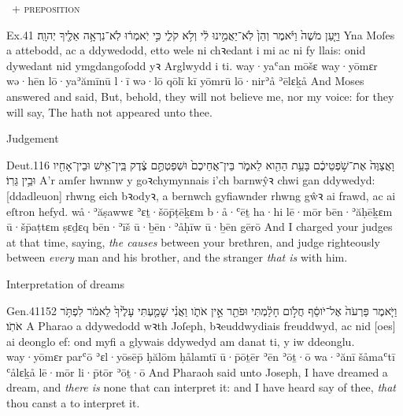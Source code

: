 \begin{frame}{\ex {}~+ \textsc{preposition}}
	\begin{example}{Ex.}{4}{1}{}{}
		\quoling
		{וַיַּ֤עַן מֹשֶׁה֙ וַיֹּ֔אמֶר וְהֵן֙ לֹֽא־יַאֲמִ֣ינוּ לִ֔י וְלֹ֥א  קֹלִ֑י כִּ֣י יֹֽאמְר֔וּ לֹֽא־נִרְאָ֥ה אֵלֶ֖יךָ יְהוָֽה׃}
		{Yna Moſes a attebodd, ac a ddywedodd, etto wele ni chꝛedant i mi ac ni   fy llais: onid dywedant nid ymgdangoſodd yꝛ Arglwydd i ti.}
		{way·yaʿan mōšɛ way·yōmɛr wə·hēn lō·yaʾămīnū l·ī wə·lō  qōlī kī yōmrū lō·nirʾå ʾēlɛḵå {\YHWH}}
		{And Moses answered and said, But, behold, they will not believe me, nor   my voice: for they will say, The {\LORD} hath not appeared unto thee.}
	\end{example}
\end{frame}



\begin{frame}{\ex Judgement}
	\begin{example}{Deut.}{1}{16}{}{}
		\quoling
		{וָאֲצַוֶּה֙ אֶת־שֹׁ֣פְטֵיכֶ֔ם בָּעֵ֥ת הַהִ֖וא לֵאמֹ֑ר  בֵּין־אֲחֵיכֶם֙ וּשְׁפַטְתֶּ֣ם צֶ֔דֶק בֵּֽין־אִ֥ישׁ וּבֵין־אָחִ֖יו וּבֵ֥ין גֵּרֽוֹ׃}
		{A’r amſer hwnnw y goꝛchymynnais i’ch barnwŷꝛ chwi gan ddywedyd:  [ddadleuon] rhwng eich bꝛodyꝛ, a bernwch gyfiawnder rhwng gŵꝛ ai frawd, ac ai eſtron hefyd.}
		{wå·ʾăṣawwɛ ʾɛṯ·šōp̄ṭēḵɛm b·å·ʿēṯ ha·hi lē·mōr  bēn·ʾăḥēḵɛm ū·šp̄aṭtɛm ṣɛḏɛq bēn·ʾīš ū·ḇēn·ʾåḥīw ū·ḇēn gērō}
		{And I charged your judges at that time, saying,  \emph{the causes} between your brethren, and judge righteously between \emph{every} man and his brother, and the stranger \emph{that is} with him.}
	\end{example}
\end{frame}


\begin{frame}{\ex Interpretation of dreams}
	\begin{example}{Gen.}{41}{15}{2}{}
		\quoling
		{וַיֹּ֤אמֶר פַּרְעֹה֙ אֶל־יֹוסֵ֔ף חֲלֹ֣ום חָלַ֔מְתִּי וּפֹתֵ֖ר אֵ֣ין אֹתֹ֑ו וַאֲנִ֗י שָׁמַ֤עְתִּי עָלֶ֙יךָ֙ לֵאמֹ֔ר   לִפְתֹּ֥ר אֹתֹֽו׃}
		{A Pharao a ddywedodd wꝛth Joſeph, bꝛeuddwydiais freuddwyd, ac nid [oes] ai deonglo ef: ond myfi a glywais ddywedyd am danat ti, y   iw ddeonglu.}
		{way·yōmɛr parʿō ʾɛl·yōsēp̄ ḥălōm ḥålamtī ū·p̄ōṯēr ʾēn ʾōṯ·ō wa·ʾănī šåmaʿtī ʿålɛḵå lē·mōr   li·p̄tōr ʾōṯ·ō}
		{And Pharaoh said unto Joseph, I have dreamed a dream, and \textit{there is} none that can interpret it: and I have heard say of thee, \textit{that} thou canst  a  to interpret it.}
	\end{example}
\end{frame}



